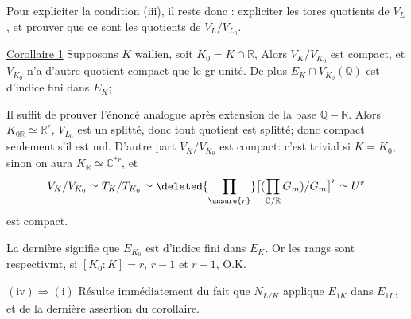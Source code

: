 Pour expliciter la condition (iii), il reste donc : expliciter les tores
quotients  de  $V_L$, et
prouver que ce sont les quotients de $V_L/V_{L_0}$.


\par\noindent
{}
\par

\uline{Corollaire 1} Supposons $K$ wailien, soit $K_0=K\cap\mathbb R$,
 Alors $V_K/V_{K_0}$ est compact, et $V_{K_0}$ n'a d'autre
 quotient compact que le gr unité.
De plus $E_K\cap V_{K_0}(\mathbb Q)$ est d'indice fini dans $E_K$;

Il suffit  de prouver l'énoncé analogue
après extension de la base $\mathbb Q-\mathbb R$.
Alors $K_{0\mathbb R}\simeq\mathbb R^r$, 
$V_{L_0}$ est un  splitté, donc tout quotient est splitté;
donc compact seulement s'il est  nul.
D'autre part $V_K/V_{K_0}$ est compact: c'est trivial si $K=K_0$,
sinon on aura $K_{\mathbb R}\simeq\mathbb C^{*r}$, et
\[
V_K/V_{K_0}\simeq T_K/T_{K_0}\simeq
\deleted{\prod_{\unsure{r}}}
\bigl[(\prod_{\mathbb C/\mathbb R}G_m)/G_m\bigr]^r\simeq U^r
\]
est compact.

La dernière  signifie  que $E_{K_0}$ est d'indice
fini dans $E_K$. Or les rangs sont respectivmt, si $[K_0:K]=r$,
$r-1$ et $r-1$, O.K.

$(\mathrm{iv})\Longrightarrow(\mathrm{i})$ Résulte immédiatement du fait que
$N_{L/K}$ applique $E_{1K}$ dans $E_{1L}$, et de la dernière
assertion du corollaire.

